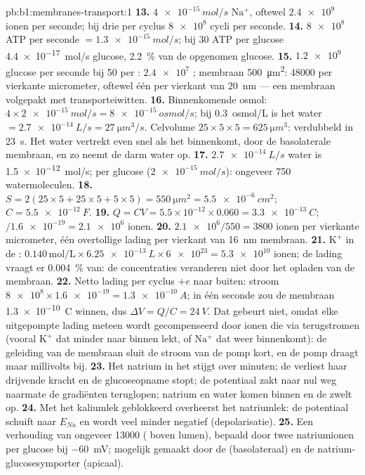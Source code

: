 \begin{solution}{pb:b1:membranes-transport:1}
\textbf{13.} $\qty{4e-15}{mol/s}$ $\mathrm{Na^+}$, oftewel
$\num{2.4e9}$ ionen per seconde; bij drie per cyclus $\num{8e8}$ cycli per
seconde.
\textbf{14.} $\num{8e8}$ ATP per seconde $= \qty{1.3e-15}{mol/s}$; bij
30 ATP per glucose \qty{4.4e-17}{mol/s} glucose, \qty{2.2}{\%} van de opgenomen
glucose.
\textbf{15.} $\num{1.2e9}$ glucose per seconde bij 50 per :
$\num{2.4e7}$ ; membraan \qty{500}{\micro m^2}: \num{48000} per
vierkante micrometer, oftewel één per vierkant van \qty{20}{nm} --- een membraan
volgepakt met transporteiwitten.
\textbf{16.} Binnenkomende osmol: $4\times\qty{2e-15}{mol/s} =
\qty{8e-15}{osmol/s}$; bij \qty{0.3}{osmol/L} is het water
$= \qty{2.7e-14}{L/s} = \qty{27}{\micro m^3/s}$. Celvolume
$25\times 5\times 5 = \qty{625}{\micro m^3}$: verdubbeld in \qty{23}{s}. Het
water vertrekt even snel als het binnenkomt, door de basolaterale membraan, en zo
neemt de darm water op.
\textbf{17.} $\qty{2.7e-14}{L/s}$ water is \qty{1.5e-12}{mol/s}; per glucose ($\qty{2e-15}{mol/s}$): ongeveer 750 watermoleculen.
\textbf{18.} $S = 2(25\times 5 + 25\times 5 + 5\times 5) =
\qty{550}{\micro m^2} = \qty{5.5e-6}{cm^2}$; $C = \qty{5.5e-12}{F}$.
\textbf{19.} $Q = CV = 5.5\times 10^{-12}\times 0.060 =
\qty{3.3e-13}{C}$; $/\num{1.6e-19} = \num{2.1e6}$ ionen.
\textbf{20.} $\num{2.1e6}/550 = 3800$ ionen per vierkante micrometer, één overtollige lading per vierkant van \qty{16}{nm} membraan.
\textbf{21.} $\mathrm{K^+}$ in de : $0.140\,\mathrm{mol/L}\times
\qty{6.25e-13}{L}\times\num{6e23} = \num{5.3e10}$ ionen; de lading vraagt er
\qty{0.004}{\%} van: de concentraties veranderen niet door het opladen van de
membraan.
\textbf{22.} Netto lading per cyclus $+e$ naar buiten: stroom $\num{8e8}\times
\num{1.6e-19} = \qty{1.3e-10}{A}$; in één seconde zou de membraan
\qty{1.3e-10}{C} winnen, dus $\Delta V = Q/C = \qty{24}{V}$. Dat gebeurt niet,
omdat elke uitgepompte lading meteen wordt gecompenseerd door ionen die via
 terugstromen (vooral $\mathrm{K^+}$ dat minder naar binnen lekt, of
$\mathrm{Na^+}$ dat weer binnenkomt): de geleiding van de membraan sluit de
stroom van de pomp kort, en de pomp draagt maar millivolts bij.
\textbf{23.} Het natrium in het  stijgt over minuten; de 
verliest haar drijvende kracht en de glucoseopname stopt; de potentiaal zakt naar
nul weg naarmate de gradiënten teruglopen; natrium en water komen binnen en de 
zwelt op.
\textbf{24.} Met het kaliumlek geblokkeerd overheerst het natriumlek: de
potentiaal schuift naar $E_{Na}$ en wordt veel minder negatief (depolarisatie).
\textbf{25.} Een verhouding van ongeveer \num{13000} ( boven lumen),
bepaald door twee natriumionen per glucose bij \qty{-60}{mV}; mogelijk gemaakt
door de  (basolateraal) en de natrium-glucosesymporter
(apicaal).
\end{solution}
